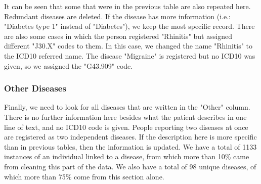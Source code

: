 It can be seen that some that were in the previous table are also repeated here. Redundant diseases are deleted. If the disease has more information (i.e.: "Diabetes type 1" instead of "Diabetes"), we keep the most specific record. There are also some cases in which the person registered "Rhinitis" but assigned different "J30.X" codes to them. In this case, we changed the name "Rhinitis" to the ICD10 referred name. The disease "Migraine" is registered but no ICD10 was given, so we assigned the "G43.909" code.

\subsubsection{Other Diseases}

Finally, we need to look for all diseases that are written in the "Other" column. There is no further information here besides what the patient describes in one line of text, and no ICD10 code is given. People reporting two diseases at once are registered as two independent diseases. If the description here is more specific than in previous tables, then the information is updated. We have a total of 1133 instances of an individual linked to a disease, from which more than 10\% came from cleaning this part of the data. We also have a total of 98 unique diseases, of which more than 75\% come from this section alone.















    

